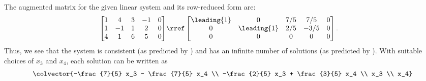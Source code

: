 The augmented matrix for the given linear system and its row-reduced form are:
\begin{align*}
\begin{bmatrix}
1 & 4 & 3 & -1 & 0\\
1 & -1 & 1 & 2 & 0\\
4 & 1 & 6 & 5 & 0
\end{bmatrix}
&\rref
\begin{bmatrix}
\leading{1} & 0 & 7/5 & 7/5 & 0\\
0 & \leading{1} & 2/5 & -3/5 & 0\\
0 & 0 & 0 & 0 & 0
\end{bmatrix}.
\end{align*}
Thus, we see that the system is consistent (as predicted by ) and has an infinite number of solutions (as predicted by ).  With suitable choices of $x_3$ and $x_4$, each solution can be written as 
%
\begin{align*}
\colvector{-\frac{7}{5} x_3 - \frac{7}{5} x_4 \\ -\frac{2}{5} x_3 + \frac{3}{5} x_4 \\ x_3 \\ x_4}
\end{align*}
%
